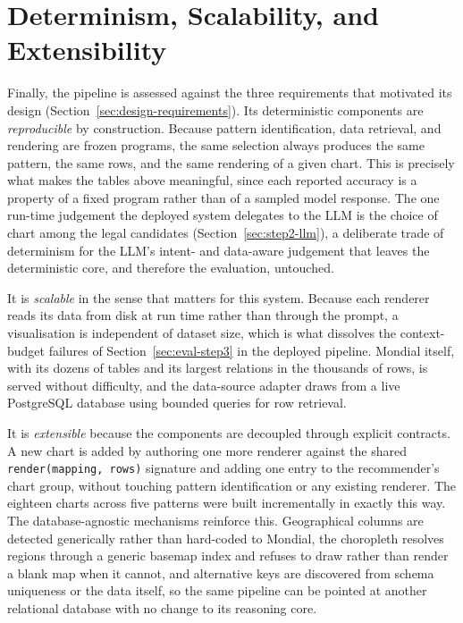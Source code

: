 \section{Determinism, Scalability, and Extensibility}
\label{sec:eval-determinism}

Finally, the pipeline is assessed against the three requirements that motivated its design (Section~\ref{sec:design-requirements}). Its deterministic components are \emph{reproducible} by construction. Because pattern identification, data retrieval, and rendering are frozen programs, the same selection always produces the same pattern, the same rows, and the same rendering of a given chart. This is precisely what makes the tables above meaningful, since each reported accuracy is a property of a fixed program rather than of a sampled model response. The one run-time judgement the deployed system delegates to the LLM is the choice of chart among the legal candidates (Section~\ref{sec:step2-llm}), a deliberate trade of determinism for the LLM's intent- and data-aware judgement that leaves the deterministic core, and therefore the evaluation, untouched.

It is \emph{scalable} in the sense that matters for this system. Because each renderer reads its data from disk at run time rather than through the prompt, a visualisation is independent of dataset size, which is what dissolves the context-budget failures of Section~\ref{sec:eval-step3} in the deployed pipeline. Mondial itself, with its dozens of tables and its largest relations in the thousands of rows, is served without difficulty, and the data-source adapter draws from a live PostgreSQL database using bounded queries for row retrieval.

It is \emph{extensible} because the components are decoupled through explicit contracts. A new chart is added by authoring one more renderer against the shared \texttt{render(mapping, rows)} signature and adding one entry to the recommender's chart group, without touching pattern identification or any existing renderer. The eighteen charts across five patterns were built incrementally in exactly this way. The database-agnostic mechanisms reinforce this. Geographical columns are detected generically rather than hard-coded to Mondial, the choropleth resolves regions through a generic basemap index and refuses to draw rather than render a blank map when it cannot, and alternative keys are discovered from schema uniqueness or the data itself, so the same pipeline can be pointed at another relational database with no change to its reasoning core.

